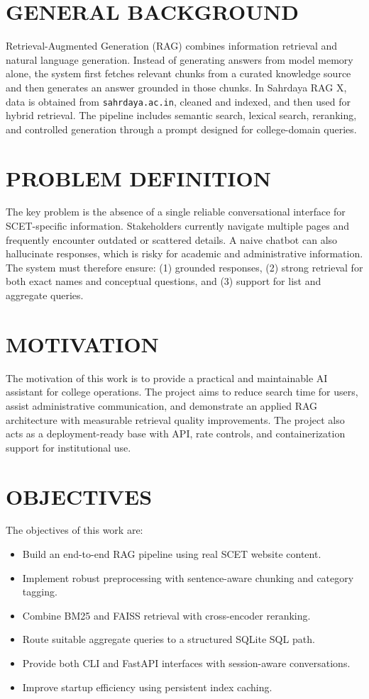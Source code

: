 \documentclass[12pt,a4paper]{report}
\begin{document}
\section{GENERAL BACKGROUND}
\hspace*{1cm}Retrieval-Augmented Generation (RAG) combines information retrieval and natural language generation. Instead of generating answers from model memory alone, the system first fetches relevant chunks from a curated knowledge source and then generates an answer grounded in those chunks. In Sahrdaya RAG X, data is obtained from \texttt{sahrdaya.ac.in}, cleaned and indexed, and then used for hybrid retrieval. The pipeline includes semantic search, lexical search, reranking, and controlled generation through a prompt designed for college-domain queries.

\section{PROBLEM DEFINITION}
\hspace*{1cm}The key problem is the absence of a single reliable conversational interface for SCET-specific information. Stakeholders currently navigate multiple pages and frequently encounter outdated or scattered details. A naive chatbot can also hallucinate responses, which is risky for academic and administrative information. The system must therefore ensure: (1) grounded responses, (2) strong retrieval for both exact names and conceptual questions, and (3) support for list and aggregate queries.

\section{MOTIVATION}
\hspace*{1cm}The motivation of this work is to provide a practical and maintainable AI assistant for college operations. The project aims to reduce search time for users, assist administrative communication, and demonstrate an applied RAG architecture with measurable retrieval quality improvements. The project also acts as a deployment-ready base with API, rate controls, and containerization support for institutional use.

\section{OBJECTIVES}
The objectives of this work are:
\begin{itemize}
    \item Build an end-to-end RAG pipeline using real SCET website content.
    \item Implement robust preprocessing with sentence-aware chunking and category tagging.
    \item Combine BM25 and FAISS retrieval with cross-encoder reranking.
    \item Route suitable aggregate queries to a structured SQLite SQL path.
    \item Provide both CLI and FastAPI interfaces with session-aware conversations.
    \item Improve startup efficiency using persistent index caching.
\end{itemize}
\end{document}
